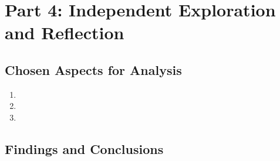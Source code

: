 \documentclass[12pt]{article}
\begin{document}
\newpage

\section*{Part 4: Independent Exploration and Reflection}

\subsection*{Chosen Aspects for Analysis}
\begin{enumerate}
    \item %
    \item %
    \item %
\end{enumerate}

\subsection*{Findings and Conclusions}
\end{document}

